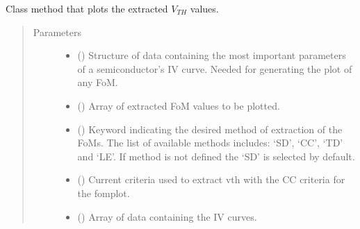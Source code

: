 \documentclass[letterpaper,10pt,english,openany, oneside]{sphinxmanual}
\begin{document}
\begin{fulllineitems}
\begin{fulllineitems}
\begin{quote}
\begin{description}
\begin{itemize}
\end{itemize}

\end{description}\end{quote}

\end{fulllineitems}


\begin{fulllineitems}
\label{\detokenize{index:fompy.fom.vth_ext.plot}}
Class method that plots the extracted \(V_{TH}\) values.
\begin{quote}\begin{description}
\item[{Parameters}] \leavevmode\begin{itemize}
\item {} 
 () \textendash{} Structure of data containing the most important parameters of a semiconductor’s IV curve.
Needed for generating the plot of any FoM.

\item {} 
 () \textendash{} Array of extracted FoM values to be plotted.

\item {} 
 () \textendash{} Keyword indicating the desired method of extraction of the FoMs. The list of available methods includes: ‘SD’, ‘CC’, ‘TD’ and ‘LE’. If method is not defined the ‘SD’ is selected by default.

\item {} 
 () \textendash{} Current criteria used to extract vth with the CC criteria for the fomplot.

\item {} 
 () \textendash{} Array of data containing the IV curves.


\end{itemize}
\end{description}
\end{quote}
\end{fulllineitems}
\end{fulllineitems}
\end{document}
